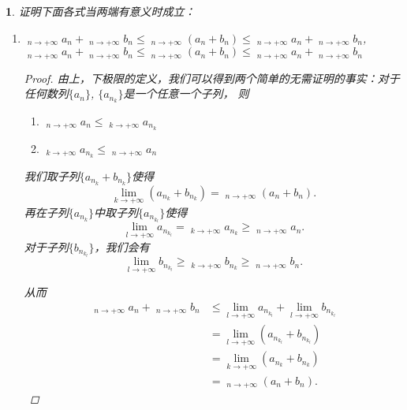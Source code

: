 \documentclass[utf8]{book}
\newtheorem{example}{}[section]             %
\DeclareMathOperator*\lowlim{\underline{lim}}
\DeclareMathOperator*\uplim{\overline{lim}}
\begin{document}
\begin{example}
证明下面各式当两端有意义时成立：
\renewcommand\labelenumi{\normalfont(\theenumi)}
\begin{enumerate}
\item $\displaystyle\lowlim_{n\to +\infty}a_n + \displaystyle\lowlim_{n\to +\infty}b_n \leq \displaystyle\lowlim_{n\to +\infty}(a_n + b_n) \leq \displaystyle\lowlim_{n\to +\infty}a_n + \displaystyle\uplim_{n\to +\infty}b_n$,\\
$\displaystyle\lowlim_{n\to +\infty}a_n + \displaystyle\uplim_{n\to +\infty}b_n \leq \displaystyle\uplim_{n\to +\infty}(a_n + b_n) \leq \displaystyle\uplim_{n\to +\infty}a_n + \displaystyle\uplim_{n\to +\infty}b_n$
\begin{proof}
由上，下极限的定义，我们可以得到两个简单的无需证明的事实：对于任何数列$\{a_n\}$, 
$\{a_{n_k}\}$是一个任意一个子列， 则
\renewcommand\labelenumi{\normalfont(\theenumi)}
\begin{enumerate}
\item $\displaystyle\lowlim_{n\to +\infty}a_n \leq \displaystyle\lowlim_{k\to +\infty}a_{n_k}$
\item $\displaystyle\uplim_{k\to +\infty}a_{n_k} \leq \displaystyle\uplim_{n\to +\infty}a_n$
\end{enumerate}
我们取子列$\{a_{n_k} + b_{n_k}\}$使得
$$\displaystyle\lim_{k\to +\infty}(a_{n_k} + b_{n_k}) = \displaystyle\lowlim_{n\to +\infty}(a_n + b_n).$$
再在子列$\{a_{n_k}\}$中取子列$\{a_{n_{k_l}}\}$使得
$$\displaystyle\lim_{l\to +\infty}a_{n_{k_l}} = \displaystyle\lowlim_{k\to +\infty}a_{n_k}\geq \displaystyle\lowlim_{n\to +\infty}a_n.$$
对于子列$\{b_{n_{k_l}}\}$，我们会有
$$\displaystyle\lim_{l\to +\infty}b_{n_{k_l}} \geq \displaystyle\lowlim_{k\to +\infty}b_{n_k}\geq \displaystyle\lowlim_{n\to +\infty}b_n.$$

从而
\begin{equation*}
\begin{split}
\displaystyle\lowlim_{n\to +\infty}a_n+\displaystyle\lowlim_{n\to +\infty}b_n &\leq \displaystyle\lim_{l\to +\infty}a_{n_{k_l}} + \displaystyle\lim_{l\to +\infty}b_{n_{k_l}} \\&= \displaystyle\lim_{l\to +\infty}(a_{n_{k_l}}+b_{n_{k_l}}) \\&= \displaystyle\lim_{k\to +\infty}(a_{n_k} + b_{n_k})  \\&= \displaystyle\lowlim_{n\to +\infty}(a_n + b_n).
\end{split}
\end{equation*}


\end{proof}
\end{enumerate}
\end{example}
\end{document}
